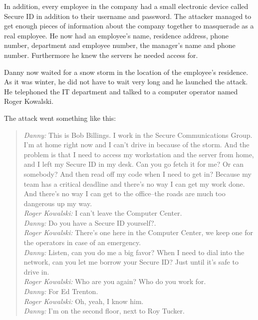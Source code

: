 In addition, every employee in the company had a small electronic device called
Secure ID in addition to their username and password. The attacker managed to
get enough pieces of information about the company together to masquerade as a
real employee. He now had an employee's name, residence address, phone number,
department and employee number, the manager's name and phone number.
Furthermore he knew the servers he needed access for.

Danny now waited for a snow storm in the location of the employee's residence.
As it was winter, he did not have to wait very long and he launched the attack.
He telephoned the IT department and talked to a computer operator named Roger
Kowalski.

The attack went something like this:

\begin{quote}
\textit{Danny:} \glqq{}This is Bob Billings. I work in the Secure Communications Group. I'm at
home right now and I can't drive in because of the storm. And the problem is
that I need to access my workstation and the server from home, and I left my
Secure ID in my desk. Can you go fetch it for me? Or can somebody? And then
read off my code when I need to get in? Because my team has a critical deadline
and there's no way I can get my work done. And there's no way I can get to the
office--the roads are much too dangerous up my way.\grqq{}\\
\textit{Roger Kowalski:} \glqq{}I can't leave the Computer Center.\grqq{}\\
\textit{Danny:} \glqq{}Do you have a Secure ID yourself?.\grqq{}\\
\textit{Roger Kowalski:} \glqq{}There's one here in the Computer Center, we keep one
for the operators in case of an emergency.\grqq{}\\
\textit{Danny:} \glqq{}Listen, can you do me a big favor? When I need to dial into
the network, can you let me borrow your Secure ID? Just until it's safe to
drive in.\grqq{}\\
\textit{Roger Kowalski:} \glqq{}Who are you again? Who do you work for.\grqq{}\\
\textit{Danny:} \glqq{}For Ed Trenton.\grqq{}\\
\textit{Roger Kowalski:} \glqq{}Oh, yeah, I know him.\grqq{}\\
\textit{Danny:} \glqq{}I'm on the second floor, next to Roy Tucker.\grqq{}\\

\end{quote}

